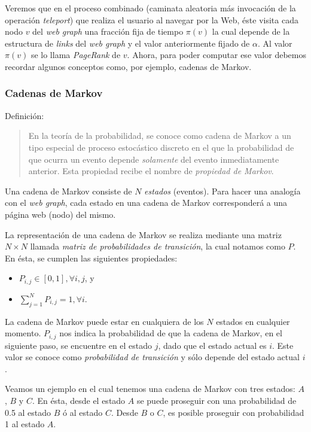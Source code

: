 		Veremos que en el proceso combinado (caminata aleatoria más invocación de la operación \textit{teleport}) que realiza el usuario al navegar por la Web, éste visita cada nodo $v$ del \textit{web graph} una fracción fija de tiempo $\pi (v)$ la cual depende de la estructura de \textit{links} del \textit{web graph} y el valor anteriormente fijado de $\alpha$. Al valor $\pi (v)$ se lo llama \textit{PageRank} de $v$. Ahora, para poder computar ese valor debemos recordar algunos conceptos como, por ejemplo, cadenas de Markov.
		
		\subsubsection{Cadenas de Markov}
			Definición:
			\begin{quote}
				En la teoría de la probabilidad, se conoce como cadena de Markov a un tipo especial de proceso estocástico discreto en el que la probabilidad de que ocurra un evento depende \textit{solamente} del evento inmediatamente anterior. Esta propiedad recibe el nombre de \textit{propiedad de Markov}.
			\end{quote}
			
			Una cadena de Markov consiste de $N$ \textit{estados} (eventos). Para hacer una analogía con el \textit{web graph}, cada estado en una cadena de Markov corresponderá a una página web (nodo) del mismo. \par
			
			La representación de una cadena de Markov se realiza mediante una matriz $N \times N$ llamada \textit{matriz de probabilidades de transición}, la cual notamos como $P$. En ésta, se cumplen las siguientes propiedades:
			\begin{itemize}
				\item $P_{i,j} \in [0,1], \forall i,j$, y
				\item $\sum_{j = 1}^{N} P_{i,j} = 1, \forall i$.
			\end{itemize}
			La cadena de Markov puede estar en cualquiera de los $N$ estados en cualquier momento. $P_{i,j}$ nos indica la probabilidad de que la cadena de Markov, en el siguiente paso, se encuentre en el estado $j$, dado que el estado actual es $i$. Este valor se conoce como \textit{probabilidad de transición} y sólo depende del estado actual $i$. \par
			
			Veamos un ejemplo en el cual tenemos una cadena de Markov con tres estados: $A$, $B$ y $C$. En ésta, desde el estado $A$ se puede proseguir con una probabilidad de 0.5 al estado $B$ ó al estado $C$. Desde $B$ o $C$, es posible proseguir con probabilidad 1 al estado $A$. \par
			
